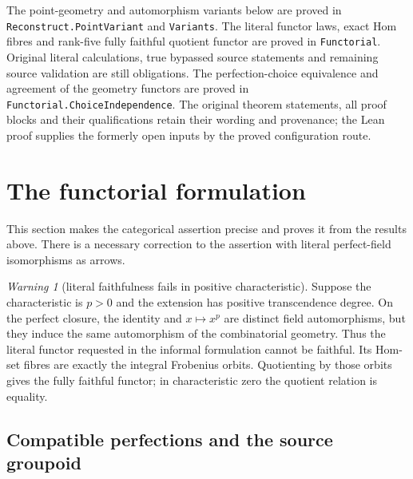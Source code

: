 \documentclass[11pt,oneside]{article}
\theoremstyle{definition}
\theoremstyle{remark}
\newtheorem{warning}[theorem]{Warning}
\newcommand{\lean}[1]{\nolinkurl{#1}}
\begin{document}
The point-geometry and automorphism variants below are proved in
\lean{Reconstruct.PointVariant} and \lean{Variants}.  The literal functor laws, exact Hom
fibres and rank-five fully faithful quotient functor are proved in \lean{Functorial}.
Original literal calculations, true bypassed source statements and remaining source
validation are still obligations.  The perfection-choice equivalence and agreement of
the geometry functors are proved in \lean{Functorial.ChoiceIndependence}.  The
original theorem statements, all proof blocks and their qualifications retain their
wording and provenance; the Lean proof supplies the formerly open inputs by the proved
configuration route.

\section{The functorial formulation}
\label{sec:functorial}

This section makes the categorical assertion precise and proves it from the results above.
There is a necessary correction to the assertion with literal perfect-field isomorphisms
as arrows.

\begin{warning}[literal faithfulness fails in positive characteristic]
Suppose the characteristic is $p>0$ and the extension has positive transcendence degree.
On the perfect closure, the identity and $x\mapsto x^p$ are distinct field automorphisms,
but they induce the same automorphism of the combinatorial geometry.  Thus the literal
functor requested in the informal formulation cannot be faithful.  Its Hom-set fibres are
exactly the integral Frobenius orbits.  Quotienting by those orbits gives the fully faithful
functor; in characteristic zero the quotient relation is equality.
\end{warning}

\subsection{Compatible perfections and the source groupoid}
\end{document}
